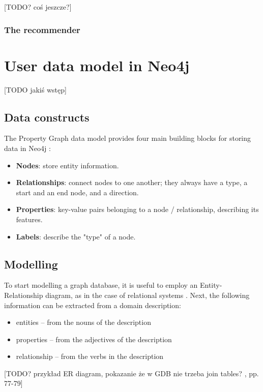 \documentclass[12pt]{report}
\begin{document}
[TODO? coś jeszcze?]

\subsubsection{The recommender}

%
\section{User data model in Neo4j}

[TODO jakiś wstęp]

\subsection{Data constructs}

The Property Graph data model provides four main building blocks for storing data in Neo4j \cite{learning_neo4j}:
\begin{itemize}
\item {\bf Nodes}: store entity information.
\item {\bf Relationships}: connect nodes to one another; they always have a type, a start and an end node, and a direction.
\item {\bf Properties}: key-value pairs belonging to a node / relationship, describing its features.
\item {\bf Labels}: describe the "type" of a node.
\end{itemize}

\subsection{Modelling}

To start modelling a graph database, it is useful to employ an Entity-Relationship diagram, as in the case of relational systems \cite{learning_neo4j}. Next, the following information can be extracted from a domain description:
\begin{itemize}
\item entities -- from the nouns of the description
\item properties -- from the adjectives of the description
\item relationship -- from the verbs in the description
\end{itemize}

[TODO? przykład ER diagram, pokazanie że w GDB nie trzeba join tables? \cite{learning_neo4j}, pp. 77-79]
\end{document}
